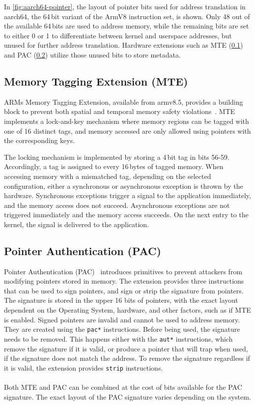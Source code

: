 In \cref{fig:aarch64-pointer}, the layout of pointer bits used for address translation in aarch64, the 64\,bit variant of the ArmV8 instruction set, is shown.
Only 48 out of the available 64\,bits are used to address memory, while the remaining bits are set to either 0 or 1 to differentiate between kernel and userspace addresses, but unused for further address translation.
 Hardware extensions such as MTE (\cref{subsec:mte}) and PAC (\cref{subsec:pac}) utilize those unused bits to store metadata.

\subsection{Memory Tagging Extension (MTE)}
\label{subsec:mte}

ARMs Memory Tagging Extension, available from armv8.5, provides a building block to prevent both spatial and temporal memory safety violations~\cite{ARM2019MTE}.
MTE implements a lock-and-key mechanism where memory regions can be tagged with one of 16 distinct tags, and memory accessed are only allowed using pointers with the corresponding keys.

The locking mechanism is implemented by storing a 4\,bit tag in bits 56-59.
Accordingly, a tag is assigned to every 16\,bytes of tagged memory.
When accessing memory with a mismatched tag, depending on the selected configuration, either a synchronous or asynchronous exception is thrown by the hardware.
Synchronous exceptions trigger a signal to the application immediately, and the memory access does not succeed.
Asynchronous exceptions are not triggered immediately and the memory access succeeds.
On the next entry to the kernel, the signal is delivered to the application.

\subsection{Pointer Authentication (PAC)}
\label{subsec:pac}

Pointer Authentication (PAC)~\cite{Qualcomm2017PointerAuth} introduces primitives to prevent attackers from modifying pointers stored in memory.
The extension provides three instructions that can be used to sign pointers, and sign or strip the signature from pointers.
The signature is stored in the upper 16 bits of pointers, with the exact layout dependent on the Operating System, hardware, and other factors, such as if MTE is enabled.
Signed pointers are invalid and cannot be used to address memory.
They are created using the \texttt{pac*} instructions.
Before being used, the signature needs to be removed.
This happens either with the \texttt{aut*} instructions, which remove the signature if it is valid, or produce a pointer that will trap when used, if the signature does not match the address.
To remove the signature regardless if it is valid, the extension provides \texttt{strip} instructions.

\paragraph{} Both MTE and PAC can be combined at the cost of bits available for the PAC signature.
The exact layout of the PAC signature varies depending on the system.
